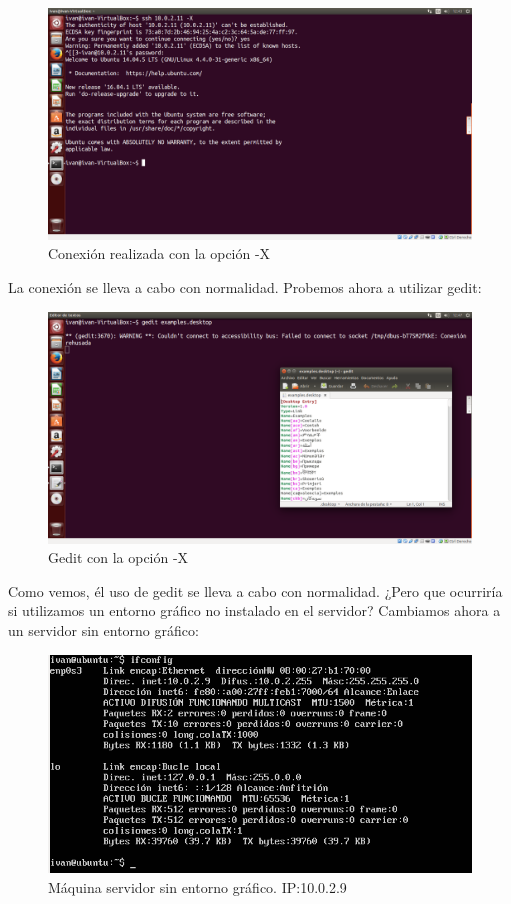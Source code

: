 \begin{itemize}
	\begin{figure}[H]
	\centering
	\includegraphics[width=0.7\linewidth]{Conexion-X}
	\caption[Conexión -X]{Conexión realizada con la opción -X}
	\label{fig:Conexion-X}
	\end{figure}

	
	La conexión se lleva a cabo con normalidad. Probemos ahora a utilizar gedit:
	\begin{figure}[H]
	\centering
	\includegraphics[width=0.7\linewidth]{UsoGedit}
	\caption[Uso Gedit]{Gedit con la opción -X}
	\label{fig:UsoGedit}
	\end{figure}
	
	Como vemos, él uso de gedit se lleva a cabo con normalidad. ¿Pero que ocurriría si utilizamos un entorno gráfico no instalado en el servidor? Cambiamos ahora a un servidor sin entorno gráfico:\\
	
	\begin{figure}[H]
	\centering
	\includegraphics[width=0.7\linewidth]{servidor-no-grafico}
	\caption[Servidor no gráfico]{Máquina servidor sin entorno gráfico. IP:10.0.2.9}
	\label{fig:servidor-no-grafico}
	\end{figure}
	

\end{itemize}
